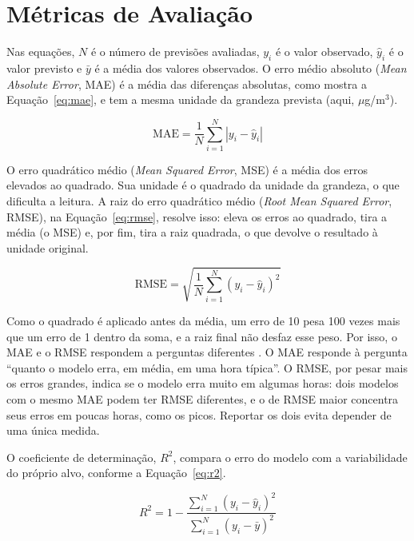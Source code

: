 \section{Métricas de Avaliação}
\label{sec:metricas_avaliacao}

 Nas equações, \(N\) é o número de previsões avaliadas, \(y_i\) é o valor observado, \(\hat{y}_i\) é o valor previsto e \(\bar{y}\) é a média dos valores observados. O erro médio absoluto (\textit{Mean Absolute Error}, MAE) é a média das diferenças absolutas, como mostra a Equação~\ref{eq:mae}, e tem a mesma unidade da grandeza prevista (aqui, \(\mu\)g/m\(^3\)).

\begin{equation}
    \text{MAE} =
    \frac{1}{N}\sum_{i=1}^{N}|y_i - \hat{y}_i|
    \label{eq:mae}
\end{equation}

O erro quadrático médio (\textit{Mean Squared Error}, MSE) é a média dos erros elevados ao quadrado. Sua unidade é o quadrado da unidade da grandeza, o que dificulta a leitura. A raiz do erro quadrático médio (\textit{Root Mean Squared Error}, RMSE), na Equação~\ref{eq:rmse}, resolve isso: eleva os erros ao quadrado, tira a média (o MSE) e, por fim, tira a raiz quadrada, o que devolve o resultado à unidade original.

\begin{equation}
    \text{RMSE} =
    \sqrt{\frac{1}{N}\sum_{i=1}^{N}(y_i - \hat{y}_i)^2}
    \label{eq:rmse}
\end{equation}

Como o quadrado é aplicado antes da média, um erro de 10 pesa 100 vezes mais que um erro de 1 dentro da soma, e a raiz final não desfaz esse peso. Por isso, o MAE e o RMSE respondem a perguntas diferentes \cite{willmott2005advantages,chai2014rmse}. O MAE responde à pergunta ``quanto o modelo erra, em média, em uma hora típica''. O RMSE, por pesar mais os erros grandes, indica se o modelo erra muito em algumas horas: dois modelos com o mesmo MAE podem ter RMSE diferentes, e o de RMSE maior concentra seus erros em poucas horas, como os picos. Reportar os dois evita depender de uma única medida.

O coeficiente de determinação, \(R^2\), compara o erro do modelo com a variabilidade do próprio alvo, conforme a Equação~\ref{eq:r2}.

\begin{equation}
    R^2 =
    1 - \frac{\sum_{i=1}^{N}(y_i - \hat{y}_i)^2}{\sum_{i=1}^{N}(y_i - \bar{y})^2}
    \label{eq:r2}
\end{equation}

